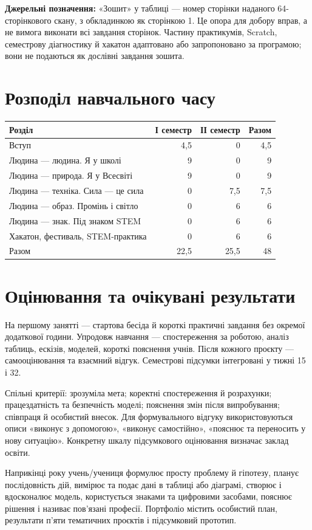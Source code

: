 \documentclass[10pt,a4paper,landscape]{article}
\begin{document}
\textbf{Джерельні позначення:} «Зошит» у таблиці — номер сторінки наданого 64-сторінкового скану, з обкладинкою як сторінкою 1. Це опора для добору вправ, а не вимога виконати всі завдання сторінок. Частину практикумів, Scratch, семестрову діагностику й хакатон адаптовано або запропоновано за програмою; вони не подаються як дослівні завдання зошита.
\newpage
\section*{Розподіл навчального часу}
\begin{tabular}{P{125mm}rrr}
\toprule Розділ & І семестр & ІІ семестр & Разом \\\midrule
Вступ & 4,5 & 0 & 4,5 \\
Людина — людина. Я у школі & 9 & 0 & 9 \\
Людина — природа. Я у Всесвіті & 9 & 0 & 9 \\
Людина — техніка. Сила — це сила & 0 & 7,5 & 7,5 \\
Людина — образ. Промінь і світло & 0 & 6 & 6 \\
Людина — знак. Під знаком STEM & 0 & 6 & 6 \\
Хакатон, фестиваль, STEM-практика & 0 & 6 & 6 \\
\midrule Разом & 22,5 & 25,5 & 48 \\
\bottomrule\end{tabular}
\section*{Оцінювання та очікувані результати}
На першому занятті — стартова бесіда й короткі практичні завдання без окремої додаткової години. Упродовж навчання — спостереження за роботою, аналіз таблиць, ескізів, моделей, короткі пояснення учнів. Після кожного проєкту — самооцінювання та взаємний відгук. Семестрові підсумки інтегровані у тижні 15 і 32.

Спільні критерії: зрозуміла мета; коректні спостереження й розрахунки; працездатність та безпечність моделі; пояснення змін після випробування; співпраця й особистий внесок. Для формувального відгуку використовуються описи «виконує з допомогою», «виконує самостійно», «пояснює та переносить у нову ситуацію». Конкретну шкалу підсумкового оцінювання визначає заклад освіти.

Наприкінці року учень/учениця формулює просту проблему й гіпотезу, планує послідовність дій, вимірює та подає дані в таблиці або діаграмі, створює і вдосконалює модель, користується знаками та цифровими засобами, пояснює рішення і називає пов’язані професії. Портфоліо містить особистий план, результати п’яти тематичних проєктів і підсумковий прототип.
\newpage
\end{document}
